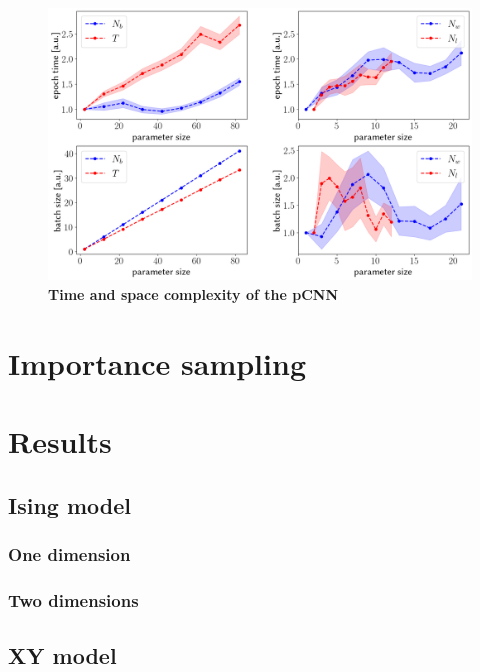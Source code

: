 \begin{figure}[H]
	\centering
	\includegraphics[width=\linewidth]{Chapter5/Figs/Raster/initial_time_space}
	\caption[Time and space complexity of the pCNN]{\textbf{Time and space complexity of the pCNN}}
	\label{fig:initialtimespace}
\end{figure}


\section{Importance sampling}
\section{Results}
\subsection{Ising model}
\subsubsection{One dimension}
\subsubsection{Two dimensions}
\subsection{XY model}